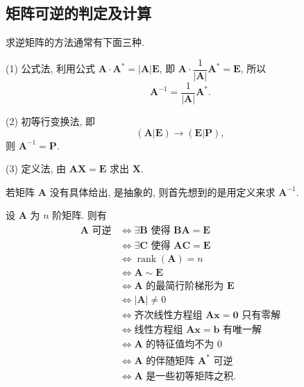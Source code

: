 \documentclass[../../main.tex]{subfiles}
\begin{document}
\subsection{矩阵可逆的判定及计算}

求逆矩阵的方法通常有下面三种.

(1) 公式法, 利用公式 \(\boldsymbol{A} \cdot \boldsymbol{A}^* = |\boldsymbol{A}|\boldsymbol{E}\), 即 \(\boldsymbol{A} \cdot \dfrac{1}{|\boldsymbol{A}|}\boldsymbol{A}^* = \boldsymbol{E}\), 所以
\[
\boldsymbol{A}^{-1} = \dfrac{1}{|\boldsymbol{A}|}\boldsymbol{A}^*.
\]

(2) 初等行变换法, 即
\[
(\boldsymbol{A} | \boldsymbol{E}) \longrightarrow (\boldsymbol{E} | \boldsymbol{P}),
\]
则 \(\boldsymbol{A}^{-1} = \boldsymbol{P}\).

(3) 定义法, 由 \(\boldsymbol{A}\boldsymbol{X} = \boldsymbol{E}\) 求出 \(\boldsymbol{X}\).

若矩阵 \(\boldsymbol{A}\) 没有具体给出, 是抽象的, 则首先想到的是用定义来求 \(\boldsymbol{A}^{-1}\).

\begin{proposition}
设 \(\boldsymbol{A}\) 为 \(n\) 阶矩阵. 则有
\[
\begin{aligned}
\boldsymbol{A} \text{ 可逆} &\Leftrightarrow \exists \boldsymbol{B} \text{ 使得 } \boldsymbol{BA} = \boldsymbol{E} \\
&\Leftrightarrow \exists \boldsymbol{C} \text{ 使得 } \boldsymbol{AC} = \boldsymbol{E} \\
&\Leftrightarrow \operatorname{rank}(\boldsymbol{A}) = n \\
&\Leftrightarrow \boldsymbol{A} \sim \boldsymbol{E} \\
&\Leftrightarrow \boldsymbol{A} \text{ 的最简行阶梯形为 } \boldsymbol{E} \\
&\Leftrightarrow |\boldsymbol{A}| \neq 0 \\
&\Leftrightarrow \text{齐次线性方程组 } \boldsymbol{Ax} = \boldsymbol{0} \text{ 只有零解} \\
&\Leftrightarrow \text{线性方程组 } \boldsymbol{Ax} = \boldsymbol{b} \text{ 有唯一解} \\
&\Leftrightarrow \boldsymbol{A} \text{ 的特征值均不为 } 0 \\
&\Leftrightarrow \boldsymbol{A} \text{ 的伴随矩阵 } \boldsymbol{A}^* \text{ 可逆} \\
&\Leftrightarrow \boldsymbol{A} \text{ 是一些初等矩阵之积}.
\end{aligned}
\]
\end{proposition}
\end{document}
